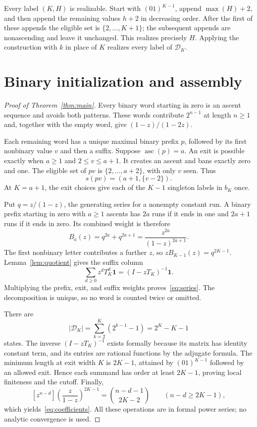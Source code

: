 \documentclass[11pt]{article}
\theoremstyle{remark}
\DeclareMathOperator{\asc}{asc}
\newcommand{\D}{\mathcal D}
\newcommand{\one}{\mathbf 1}
\begin{document}
Every label $(K,H)$ is realizable. Start with $(01)^{K-1}$, append
$\max(H)+2$, and then append the remaining values $h+2$ in decreasing
order. After the first of these appends the eligible set is
$\{2,\ldots,K+1\}$; the subsequent appends are nonascending and leave
it unchanged. This realizes precisely $H$. Applying the construction
with $k$ in place of $K$ realizes every label of $\D_K$.

\section{Binary initialization and assembly}

\begin{proof}[Proof of Theorem~\ref{thm:main}]
Every binary word starting in zero is an ascent sequence and avoids both
patterns. These words contribute $2^{n-1}$ at length $n\geq1$ and,
together with the empty word, give $(1-z)/(1-2z)$.

Each remaining word has a unique maximal binary prefix $p$, followed by
its first nonbinary value $v$ and then a suffix. Suppose $\asc(p)=a$.
An exit is possible exactly when $a\geq1$ and $2\leq v\leq a+1$.
It creates an ascent and bans exactly zero and one. The eligible set of
$pv$ is $\{2,\ldots,a+2\}$, with only $v$ seen. Thus
\begin{equation}\label{eq:initial}
 s(pv)=(a+1,\{v-2\}).
\end{equation}
At $K=a+1$, the exit choices give each of the $K-1$ singleton labels
in $b_K$ once.

Put $q=z/(1-z)$, the generating series for a nonempty constant run.
A binary prefix starting in zero with $a\geq1$ ascents has $2a$ runs
if it ends in one and $2a+1$ runs if it ends in zero. Its combined
weight is therefore
\[
 B_a(z)=q^{2a}+q^{2a+1}=\frac{z^{2a}}{(1-z)^{2a+1}}.
\]
The first nonbinary letter contributes a further $z$, so
$zB_{K-1}(z)=q^{2K-1}$. Lemma~\ref{lem:quotient} gives the suffix
column
\[
 \sum_{d\geq0}z^dT_K^d\one=(I-zT_K)^{-1}\one.
\]
Multiplying the prefix, exit, and suffix weights proves~\eqref{eq:series}.
The decomposition is unique, so no word is counted twice or omitted.

There are
\[
 |\D_K|=\sum_{k=2}^K(2^{k-1}-1)=2^K-K-1
\]
states. The inverse $ (I-zT_K)^{-1}$ exists formally because its matrix
has identity constant term, and its entries are rational functions by
the adjugate formula. The minimum length at exit width $K$ is $2K-1$,
attained by $(01)^{K-1}$ followed by an allowed exit. Hence each summand
has order at least $2K-1$, proving local finiteness and the cutoff.
Finally,
\[
 [z^{n-d}]\left(\frac{z}{1-z}\right)^{2K-1}
 =\binom{n-d-1}{2K-2}\qquad(n-d\geq2K-1),
\]
which yields~\eqref{eq:coefficients}. All these operations are in formal
power series; no analytic convergence is used.
\end{proof}
\end{document}
